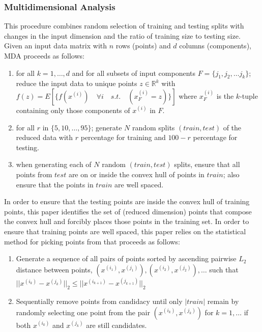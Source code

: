 \documentclass{scspaperproc}
\theoremstyle{scsthe}
\begin{document}
\subsubsection{Multidimensional Analysis}
This procedure combines random selection of training and testing
splits with changes in the input dimension and the ratio of training
size to testing size. Given an input data matrix with $n$ rows
(points) and $d$ columns (components), MDA proceeds as follows:
\begin{enumerate}
\item for all $k = 1, \ldots, d$ and for all subsets of input
  components $F = \{ j_1, j_2, \ldots j_k \}$; reduce the input data
  to unique points $z \in \mathbb{R}^k$ with $f(z) = E[ \{ f(x^{(i)})
    \quad \forall i \quad s.t. \quad (x^{(i)}_F = z) \} ]$ where
  $x^{(i)}_F$ is the $k$-tuple containing only those components of
  $x^{(i)}$ in $F$.
\item for all $r$ in $\{5, 10, \ldots, 95\}$; generate $N$ random
  splits $(train, test)$ of the reduced data with $r$ percentage for
  training and $100 - r$ percentage for testing.
\item when generating each of $N$ random $(train, test)$ splits,
  ensure that all points from $test$ are on or inside the convex hull
  of points in $train$; also ensure that the points in $train$ are
  well spaced.
\end{enumerate}

In order to ensure that the testing points are inside the convex hull
of training points, this paper identifies the set of (reduced
dimension) points that compose the convex hull and forcibly places
those points in the training set. In order to ensure that training
points are well spaced, this paper relies on the statistical method
for picking points from  that proceeds
as follows:
\begin{enumerate}
\item Generate a sequence of all pairs of points sorted by ascending
  pairwise $L_2$ distance between points, ${(x^{(i_1)},x^{(j_1)}),
    (x^{(i_2)},x^{(j_2)}), \ldots}$ such that
  $||x^{(i_k)}-x^{(j_k)}||_2 \leq ||x^{(i_{k+1})}-x^{(j_{k+1})}||_2$
\item Sequentially remove points from candidacy until only $|train|$
  remain by randomly selecting one point from the pair $(x^{(i_k)},
  x^{(j_k)})$ for $k = 1,\ldots$ if both $x^{(i_k)}$ and $x^{(j_k)}$
  are still candidates.
\end{enumerate}
\end{document}
